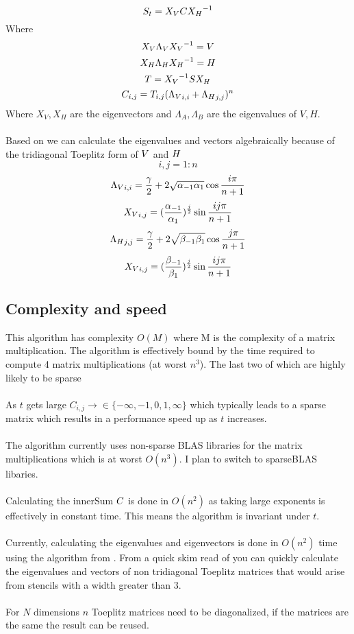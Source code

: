 \documentclass{article}
\begin{document}
\[ S_t = {X_V} C {X_H}^{-1} \] 
Where
\[{X_V} {\Lambda_V} {X_V}^{-1} = V \]
\[{X_H} {\Lambda_H} {X_H}^{-1} = H\]
\[T = {X_V}^{-1} S {X_H}\]
\[C_{i,j} = T_{i,j} ({\Lambda_V}_{i,i} + {\Lambda_H}_{j,j})^n\]
Where $X_V, X_H$ are the eigenvectors and $\Lambda_A,\Lambda_B$ are the eigenvalues of $V,H$. \\ \\
Based on \cite{noschese2013tridiagonal} we can calculate the eigenvalues and vectors 
algebraically because of the tridiagonal Toeplitz form of $V$ and $H$ 
\[ i,j = 1:n\]
\[ {\Lambda_V}_{i,i} = \frac{\gamma}{2} + 2\sqrt{\alpha_{-1} \alpha_{1}}\cos{\frac{i\pi}{n+1}}\]
\[ {X_V}_{i,j} = (\frac{\alpha_{-1}}{\alpha_{1}})^{\frac{j}{2}}\sin{\frac{ij\pi}{n+1}} \]
\[ {\Lambda_H}_{j,j} = \frac{\gamma}{2} + 2\sqrt{\beta_{-1} \beta_{1}}\cos{\frac{j\pi}{n+1}} \]
\[ {X_V}_{i,j} = (\frac{\beta_{-1}}{\beta_{1}})^{\frac{j}{2}}\sin{\frac{ij\pi}{n+1}} \]
\subsection*{Complexity and speed}
This algorithm has complexity $O(M)$ where M is the complexity of a matrix multiplication. 
The algorithm is effectively bound by the time required to compute 4 matrix multiplications (at worst $n^3$). The last two of which are highly likely to be sparse \\ \\
As $t$ gets large $C_{i,j} \rightarrow \in \{- \infty, -1, 0, 1, \infty\}$ which typically leads to a sparse matrix 
which results in a performance speed up as $t$ increases.\\ \\
The algorithm currently uses non-sparse BLAS libraries for the matrix multiplications which is at worst $O(n^3)$. 
I plan to switch to sparseBLAS libaries.  \\ \\
Calculating the innerSum $C$ is done in $O(n^2)$ as taking large exponents is effectively in constant time. 
This means the algorithm is invariant under $t$. \\ \\ 
Currently, calculating the eigenvalues and eigenvectors is done in $O(n^2)$ time using the algorithm from \cite{noschese2013tridiagonal}.
From a quick skim read of \cite{bogoya2022fast} you can quickly calculate the eigenvalues and vectors of non tridiagonal Toeplitz 
matrices that would arise from stencils with a width greater than 3. \\ \\
For $N$ dimensions $n$ Toeplitz matrices need to be diagonalized, if the matrices are the same the result can be reused. 
\end{document}
